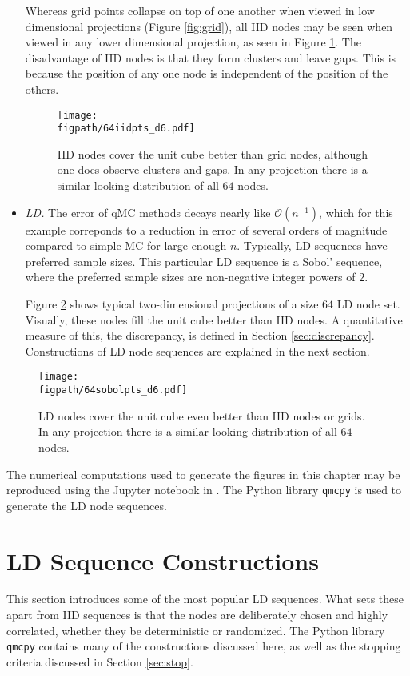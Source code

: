 \documentclass{svproc}
\newcommand{\figpath}{Figures}
\begin{document}
\begin{itemize}
	Whereas grid points collapse on top of one another when viewed in low dimensional projections (Figure \ref{fig:grid}), all IID nodes may be seen when viewed in any lower dimensional projection, as seen in Figure \ref{fig:iid}.  The disadvantage of IID nodes is that they form clusters and leave gaps.  This is because the position of any one node is independent of the position of the others.

\begin{figure}
	\centering
	\texttt{[image: \\figpath/64iidpts\_d6.pdf]}
	\caption{IID nodes cover the unit cube better than grid nodes, although one does observe clusters and gaps.  In any  projection there is  a similar looking distribution of all $64$ nodes. \label{fig:iid}}
\end{figure}

	\item \emph{LD.}  The error of qMC methods decays nearly like $\mathcal{O}(n^{-1})$, which for this example correponds to a reduction in error of several orders of magnitude compared to simple MC for large enough $n$.  Typically, LD sequences have preferred sample sizes.  This particular LD sequence is a Sobol' sequence, where the preferred sample sizes are non-negative integer powers of $2$.

	Figure \ref{fig:ld} shows typical two-dimensional projections of a size $64$ LD node set.  Visually, these nodes fill the unit cube better than IID nodes.  A quantitative measure of this, the discrepancy, is defined in Section \ref{sec:discrepancy}.  Constructions of LD node sequences are explained in the next section.

\end{itemize}



\begin{figure}
	\centering
	\texttt{[image: \\figpath/64sobolpts\_d6.pdf]}
	\caption{LD nodes cover the unit cube even better than IID nodes or grids.  In any  projection there is  a similar looking distribution of all $64$ nodes. \label{fig:ld}}
\end{figure}

The numerical computations used to generate the figures in this chapter may be reproduced using the Jupyter notebook in \cite{MCQMC2024TutorialNotebook}. The Python library \texttt{qmcpy} \cite{QMCPy2020a} is used to generate the LD node sequences. 

\section{LD Sequence Constructions} \label{sec:construct}
This section introduces some of the most popular LD sequences.  What sets these apart from IID sequences is that the nodes are deliberately chosen and highly correlated, whether they be deterministic or randomized. The Python library \texttt{qmcpy} \cite{QMCPy2020a} contains many of the constructions discussed here, as well as the stopping criteria discussed in Section \ref{sec:stop}.
\end{document}
